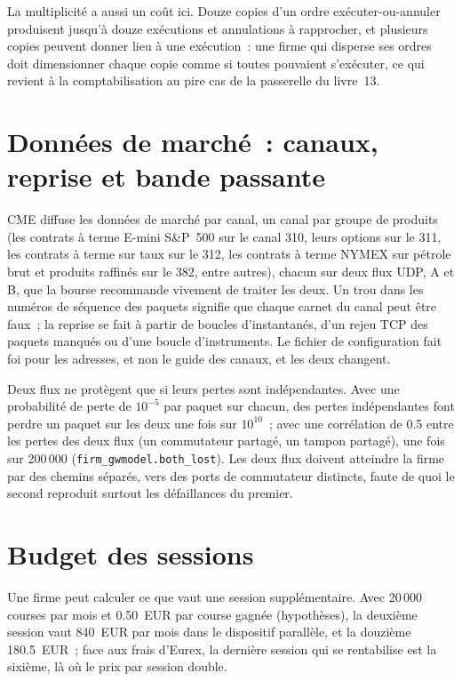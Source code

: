 \label{lst:nw:futures-connectivity:reconcile}

La multiplicité a aussi un coût ici. Douze copies d'un ordre exécuter-ou-annuler produisent jusqu'à douze exécutions et annulations
à rapprocher, et plusieurs copies peuvent donner lieu à une exécution~: une firme qui disperse ses ordres doit dimensionner chaque copie comme si toutes pouvaient s'exécuter, ce qui revient à
la comptabilisation au pire cas de la passerelle du livre~13.

\section{Données de marché~: canaux, reprise et bande passante}

CME diffuse les données de marché par canal, un canal par groupe de produits (les contrats à terme E-mini S\&P~500 sur le canal 310, leurs options
sur le 311, les contrats à terme sur taux sur le 312, les contrats à terme NYMEX sur pétrole brut et produits raffinés sur le 382, entre autres), chacun sur deux flux UDP, A et B,
que la bourse recommande vivement de traiter les deux. Un trou dans les numéros de séquence des paquets signifie que chaque carnet du
canal peut être faux~; la reprise se fait à partir de boucles d'instantanés, d'un rejeu TCP des paquets manqués ou d'une boucle d'instruments. Le fichier de configuration
fait foi pour les adresses, et non le guide des canaux, et les deux changent.

Deux flux ne protègent que si leurs pertes sont indépendantes. Avec une probabilité de perte de $10^{-5}$ par paquet sur chacun, des pertes indépendantes
font perdre un paquet sur les deux une fois sur $10^{10}$~; avec une corrélation de 0.5 entre les pertes des deux flux (un commutateur partagé, un
tampon partagé), une fois sur 200\,000 (\texttt{firm\_gwmodel.both\_lost}). Les deux flux doivent atteindre la firme par des chemins séparés, vers
des ports de commutateur distincts, faute de quoi le second reproduit surtout les défaillances du premier.

\section{Budget des sessions}

Une firme peut calculer ce que vaut une session supplémentaire. Avec 20\,000 courses par mois et 0.50~EUR par course gagnée (hypothèses), la
deuxième session vaut 840~EUR par mois dans le dispositif parallèle, et la douzième 180.5~EUR~; face aux frais d'Eurex, la dernière
session qui se rentabilise est la sixième, là où le prix par session double.

